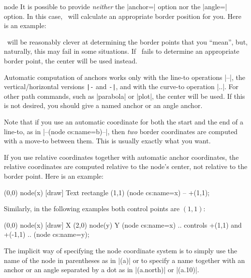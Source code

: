 \begin{coordinatesystem}{node}
    It is possible to provide \emph{neither} the |anchor=| option nor the
    |angle=| option. In this case, \tikzname\ will calculate an appropriate
    border position for you. Here is an example:
\begin{codeexample}[preamble={\usetikzlibrary{shapes.geometric}}]
\end{codeexample}

    \tikzname\ will be reasonably clever at determining the border points that
    you ``mean'', but, naturally, this may fail in some situations. If
    \tikzname\ fails to determine an appropriate border point, the center will
    be used instead.

    Automatic computation of anchors works only with the line-to operations
    |--|, the vertical/horizontal versions \verb!|-! and \verb!-|!, and with
    the curve-to operation |..|. For other path commands, such as |parabola| or
    |plot|, the center will be used. If this is not desired, you should give a
    named anchor or an angle anchor.

    Note that if you use an automatic coordinate for both the start and the end
    of a line-to, as in |--(node cs:name=b)--|, then \emph{two} border
    coordinates are computed with a move-to between them. This is usually
    exactly what you want.

    If you use relative coordinates together with automatic anchor coordinates,
    the relative coordinates are computed relative to the node's center, not
    relative to the border point. Here is an example:
\begin{codeexample}[]
\tikz \draw (0,0) node(x) [draw] {Text}
            rectangle (1,1)
            (node cs:name=x) -- +(1,1);
\end{codeexample}

    Similarly, in the following examples both control points are $(1,1)$:
\begin{codeexample}[]
\tikz \draw (0,0) node(x) [draw] {X}
            (2,0) node(y) {Y}
            (node cs:name=x) .. controls +(1,1) and +(-1,1) ..
            (node cs:name=y);
\end{codeexample}

    The implicit way of specifying the node coordinate system is to simply use
    the name of the node in parentheses as in |(a)| or to specify a name
    together with an anchor or an angle separated by a dot as in |(a.north)| or
    |(a.10)|.


\end{coordinatesystem}
